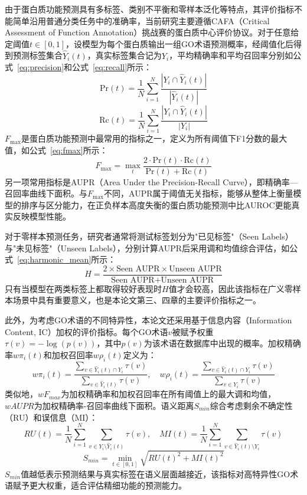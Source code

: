 由于蛋白质功能预测具有多标签、类别不平衡和零样本泛化等特点，其评价指标不能简单沿用普通分类任务中的准确率，当前研究主要遵循CAFA（Critical Assessment of Function Annotation）挑战赛\cite{zhou2019cafa}的蛋白质中心评价协议。对于任意给定阈值$t \in [0,1]$，设模型为每个蛋白质输出一组GO术语预测概率，经阈值化后得到预测标签集合$\hat{Y}_i(t)$，真实标签集合记为$Y_i$，平均精确率和平均召回率分别如公式~\eqref{eq:precision}和公式~\eqref{eq:recall}所示：
\begin{equation}
\label{eq:precision}
\text{Pr}(t)=\frac{1}{N}\sum_{i=1}^{N}\frac{|Y_i \cap \hat{Y}_i(t)|}{|\hat{Y}_i(t)|}
\end{equation}
\begin{equation}
\label{eq:recall}
\text{Rc}(t)=\frac{1}{N}\sum_{i=1}^{N}\frac{|Y_i \cap \hat{Y}_i(t)|}{|Y_i|}
\end{equation}
$F_{\max}$是蛋白质功能预测中最常用的指标之一，定义为所有阈值下F1分数的最大值，如公式~\eqref{eq:fmax}所示：
\begin{equation}
\label{eq:fmax}
F_{\max} = \max_t \frac{2 \cdot \text{Pr}(t) \cdot \text{Rc}(t)}{\text{Pr}(t) + \text{Rc}(t)}
\end{equation}
另一项常用指标是AUPR（Area Under the Precision-Recall Curve），即精确率—召回率曲线下面积。与$F_{\max}$不同，AUPR属于阈值无关指标，能够从整体上衡量模型的排序与区分能力，在正负样本高度失衡的蛋白质功能预测中比AUROC更能真实反映模型性能。

对于零样本预测任务，研究者通常将测试标签划分为"已见标签"（Seen Labels）与"未见标签"（Unseen Labels），分别计算AUPR后采用调和均值综合评估，如公式~\eqref{eq:harmonic_mean}所示：
\begin{equation}
\label{eq:harmonic_mean}
H = \frac{2 \times \text{Seen AUPR} \times \text{Unseen AUPR}}{\text{Seen AUPR} + \text{Unseen AUPR}}
\end{equation}
只有当模型在两类标签上都取得较好表现时$H$值才会较高，因此该指标在广义零样本场景中具有重要意义，也是本论文第三、四章的主要评价指标之一。

此外，为考虑GO术语的不同特异性，本论文还采用基于信息内容（Information Content, IC）加权的评价指标。每个GO术语$v$被赋予权重$\tau(v) = -\log(p(v))$，其中$p(v)$为该术语在数据库中出现的概率。加权精确率$w\pi_i(t)$和加权召回率$w\rho_i(t)$定义为：
\begin{equation}
    w\pi_i(t) = \frac{\sum_{v \in \hat{Y}_i(t) \cap Y_i} \tau(v)}{\sum_{v \in \hat{Y}_i(t)} \tau(v)}, \quad w\rho_i(t) = \frac{\sum_{v \in \hat{Y}_i(t) \cap Y_i} \tau(v)}{\sum_{v \in Y_i} \tau(v)}
\end{equation}
类似地，$wF_{max}$为加权精确率和加权召回率在所有阈值上的最大调和均值，$wAUPR$为加权精确率-召回率曲线下面积。语义距离$S_{min}$综合考虑剩余不确定性（RU）和误信息（MI）：
\begin{equation}
    RU(t) = \frac{1}{N} \sum_{i=1}^{N} \sum_{v \in Y_i \setminus \hat{Y}_i(t)} \tau(v), \quad MI(t) = \frac{1}{N} \sum_{i=1}^{N} \sum_{v \in \hat{Y}_i(t) \setminus Y_i} \tau(v)
\end{equation}
\begin{equation}
    S_{min} = \min_{t \in [0, 1]} \sqrt{RU(t)^2 + MI(t)^2}
\end{equation}
$S_{min}$值越低表示预测结果与真实标签在语义层面越接近，该指标对高特异性GO术语赋予更大权重，适合评估精细功能的预测能力。

